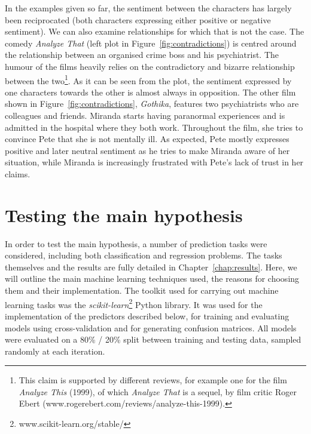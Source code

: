 \documentclass[bsc,frontabs,singlespacing,parskip, twoside]{infthesis}
\begin{document}
In the examples given so far, the sentiment between the characters has largely been reciprocated (both characters expressing either positive or negative sentiment). We can also examine relationships for which that is not the case. The comedy \textit{Analyze That} (left plot in Figure~\ref{fig:contradictions}) is centred around the relationship between an organised crime boss and his psychiatrist. The humour of the films heavily relies on the contradictory and bizarre relationship between the two\footnote{This claim is supported by different reviews, for example one for the film \textit{Analyze This} (1999), of which \textit{Analyze That} is a sequel, by film critic Roger Ebert (www.rogerebert.com/reviews/analyze-this-1999).}. As it can be seen from the plot, the sentiment expressed by one characters towards the other is almost always in opposition. The other film shown in Figure~\ref{fig:contradictions}, \textit{Gothika}, features two psychiatrists who are colleagues and friends. Miranda starts having paranormal experiences and is admitted in the hospital where they both work. Throughout the film, she tries to convince Pete that she is not mentally ill. As expected, Pete mostly expresses positive and later neutral sentiment as he tries to make Miranda aware of her situation, while Miranda is increasingly frustrated with Pete's lack of trust in her claims.


\section{Testing the main hypothesis}
\label{sec:predictors}
In order to test the main hypothesis, a number of prediction tasks were considered, including both classification and regression problems. The tasks themselves and the results are fully detailed in Chapter~\ref{chap:results}. Here, we will outline the main machine learning techniques used, the reasons for choosing them and their implementation. The toolkit used for carrying out machine learning tasks was the \textit{scikit-learn}\footnote{www.scikit-learn.org/stable/} Python library. It was used for the implementation of the predictors described below, for training and evaluating models using cross-validation and for generating confusion matrices. All models were evaluated on a 80\% / 20\% split between training and testing data, sampled randomly at each iteration.
\end{document}
